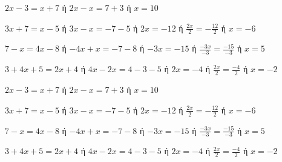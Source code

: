 \begin{alist}
\item $ 2x-3=x+7 $ ή $ 2x-x=7+3 $ ή $ x=10 $
\item $ 3x+7=x-5 $ ή $ 3x-x=-7-5 $ ή $ 2x=-12 $ ή $ \frac{2x}{2}=-\frac{12}{2} $ ή $ x=-6 $
\item $ 7-x=4x-8 $ ή $ -4x+x=-7-8 $ ή $ -3x=-15 $ ή $ \frac{-3x}{-3}=\frac{-15}{-3} $ ή $ x=5 $
\item $ 3+4x+5=2x+4 $ ή $ 4x-2x=4-3-5 $ ή $ 2x=-4 $ ή $ \frac{2x}{2}=\frac{-4}{2} $ ή $ x=-2 $
\end{alist}
\begin{alist}
\item $ 2x-3=x+7 $ ή $ 2x-x=7+3 $ ή $ x=10 $
\item $ 3x+7=x-5 $ ή $ 3x-x=-7-5 $ ή $ 2x=-12 $ ή $ \frac{2x}{2}=-\frac{12}{2} $ ή $ x=-6 $
\item $ 7-x=4x-8 $ ή $ -4x+x=-7-8 $ ή $ -3x=-15 $ ή $ \frac{-3x}{-3}=\frac{-15}{-3} $ ή $ x=5 $
\item $ 3+4x+5=2x+4 $ ή $ 4x-2x=4-3-5 $ ή $ 2x=-4 $ ή $ \frac{2x}{2}=\frac{-4}{2} $ ή $ x=-2 $
\end{alist}
